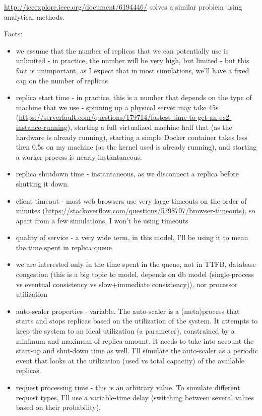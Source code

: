 \documentclass{scrartcl}
\begin{document}
\url{http://ieeexplore.ieee.org/document/6194446/} solves a similar problem using
analytical methods.

Facts:
\begin{itemize}
\item we assume that the number of replicas that we can potentially use is
unlimited - in practice, the number will be very high, but limited - but this
fact is unimportant, as I expect that in most simulations, we'll have a fixed
cap on the number of replicas
\item replica start time - in practice, this is a number that depends on the type of
machine that we use - spinning up a physical server may take 45s
(\url{https://serverfault.com/questions/179714/fastest-time-to-get-an-ec2-instance-running}),
starting a full virtualized machine half that (as the hardware is already
running), starting a simple Docker container takes less then 0.5s on my
machine (as the kernel used is already running), and starting a worker process
is nearly instantaneous.
\item replica shutdown time - instantaneous, as we disconnect a replica before
shutting it down.
\item client timeout - most web browsers use very large timeouts on the order of minutes
(\url{https://stackoverflow.com/questions/5798707/browser-timeouts}), so apart from
a few simulations, I won't be using timeouts
\item quality of service - a very wide term, in this model, I'll be using it to mean
the time spent in replica queue
\item we are interested only in the time spent in the queue, not in TTFB, database
congestion (this is a big topic to model, depends on db model (single-process
vs eventual consistency vs slow+immediate consistency)), nor processor utilization
\item auto-scaler properties - variable. The auto-scaler is a (meta)process that
starts and stops replicas based on the utilization of the system. It attempts
to keep the system to an ideal utilization (a parameter), constrained by a
minimum and maximum of replica amount. It needs to take into account the
start-up and shut-down time as well. I'll simulate the auto-scaler as a
periodic event that looks at the utilization (used vs total capacity) of the
available replicas.
\item request processing time - this is an arbitrary value. To simulate
different request types, I'll use a variable-time delay (switching between
several values based on their probability).

\end{itemize}
\end{document}
